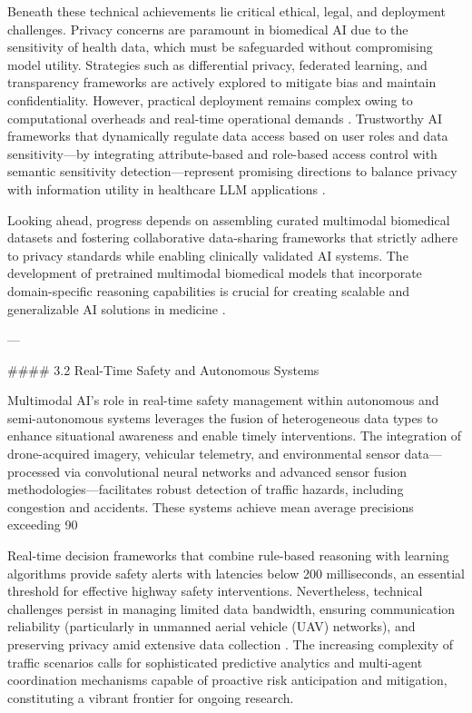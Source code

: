 \documentclass[11pt]{article}
\begin{document}
Beneath these technical achievements lie critical ethical, legal, and deployment challenges. Privacy concerns are paramount in biomedical AI due to the sensitivity of health data, which must be safeguarded without compromising model utility. Strategies such as differential privacy, federated learning, and transparency frameworks are actively explored to mitigate bias and maintain confidentiality. However, practical deployment remains complex owing to computational overheads and real-time operational demands \cite{ref11}\cite{ref12}. Trustworthy AI frameworks that dynamically regulate data access based on user roles and data sensitivity—by integrating attribute-based and role-based access control with semantic sensitivity detection—represent promising directions to balance privacy with information utility in healthcare LLM applications \cite{ref11}.

Looking ahead, progress depends on assembling curated multimodal biomedical datasets and fostering collaborative data-sharing frameworks that strictly adhere to privacy standards while enabling clinically validated AI systems. The development of pretrained multimodal biomedical models that incorporate domain-specific reasoning capabilities is crucial for creating scalable and generalizable AI solutions in medicine \cite{ref12}.

---

#### 3.2 Real-Time Safety and Autonomous Systems

Multimodal AI’s role in real-time safety management within autonomous and semi-autonomous systems leverages the fusion of heterogeneous data types to enhance situational awareness and enable timely interventions. The integration of drone-acquired imagery, vehicular telemetry, and environmental sensor data—processed via convolutional neural networks and advanced sensor fusion methodologies—facilitates robust detection of traffic hazards, including congestion and accidents. These systems achieve mean average precisions exceeding 90%

Real-time decision frameworks that combine rule-based reasoning with learning algorithms provide safety alerts with latencies below 200 milliseconds, an essential threshold for effective highway safety interventions. Nevertheless, technical challenges persist in managing limited data bandwidth, ensuring communication reliability (particularly in unmanned aerial vehicle (UAV) networks), and preserving privacy amid extensive data collection \cite{ref27}. The increasing complexity of traffic scenarios calls for sophisticated predictive analytics and multi-agent coordination mechanisms capable of proactive risk anticipation and mitigation, constituting a vibrant frontier for ongoing research.
\end{document}
